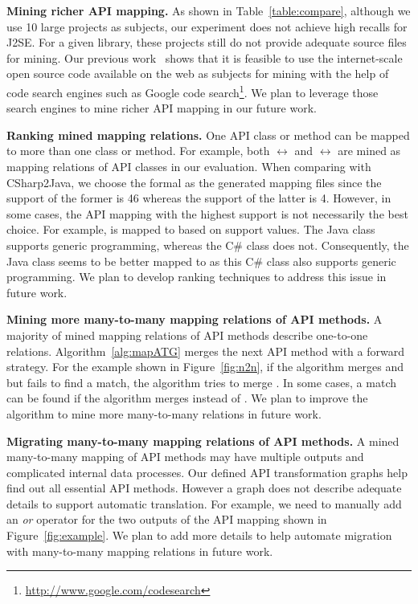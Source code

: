 \textbf{Mining richer API mapping.} As shown in
Table~\ref{table:compare}, although we use 10 large projects as
subjects, our experiment does not achieve high recalls for J2SE. For
a given library, these projects still do not provide adequate source
files for mining. Our previous
work~\cite{thummalapenta07parseweb,thummalapentaase08spotweb} shows
that it is feasible to use the internet-scale open source code
available on the web as subjects for mining with the help of code
search engines such as Google code
search\footnote{\url{http://www.google.com/codesearch}}. We plan to
leverage those search engines to mine richer API mapping in our
future work.

\textbf{Ranking mined mapping relations.} One API class or method
can be mapped to more than one class or method. For example, both
$\leftrightarrow$ 
and $\leftrightarrow$
 are mined as mapping relations of API classes
in our evaluation. When comparing with CSharp2Java, we choose the
formal as the generated mapping files since the support of the
former is 46 whereas the support of the latter is 4. However, in
some cases, the API mapping with the highest support is not
necessarily the best choice. For example,
 is mapped to
 based on support values. The
Java class supports generic programming, whereas the C\# class does
not. Consequently, the Java class seems to be better mapped to
 as this C\# class also
supports generic programming. We plan to develop ranking techniques
to address this issue in future work.

\textbf{Mining more many-to-many mapping relations of API methods.}
A majority of mined mapping relations of API methods describe
one-to-one relations. Algorithm~\ref{alg:mapATG} merges the next API
method with a forward strategy. For the example shown in
Figure~\ref{fig:n2n}, if the algorithm merges  and
 but fails to find a match, the algorithm tries to
merge . In some cases, a match can be found if the
algorithm merges  instead of .
We plan to improve the algorithm to mine more many-to-many relations
in future work.

\textbf{Migrating many-to-many mapping relations of API methods.} A
mined many-to-many mapping of API methods may have multiple outputs
and complicated internal data processes. Our defined API
transformation graphs help find out all essential API methods.
However a graph does not describe adequate details to support
automatic translation. For example, we need to manually add an
\emph{or} operator for the two outputs of the API mapping shown in
Figure~\ref{fig:example}. We plan to add more details to help
automate migration with many-to-many mapping relations in future
work.

